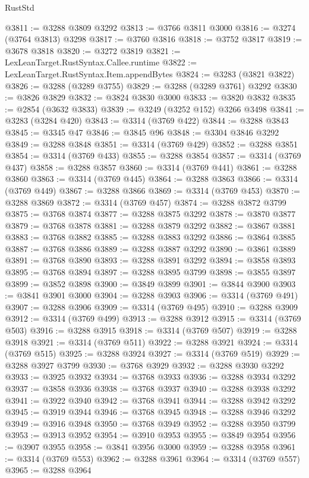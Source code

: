 \begin{lexlean}{RustStd}
\begin{coremodule}
@3811 := @3288 @3809 @3292
@3813 := @3766 @3811 @3000
@3816 := @3274 (@3764 @3813) @3298
@3817 := @3760 @3816
@3818 := @3752 @3817
@3819 := @3678 @3818
@3820 := @3272 @3819
@3821 := LexLeanTarget.RustSyntax.Callee.runtime
@3822 := LexLeanTarget.RustSyntax.Item.appendBytes
@3824 := @3283 (@3821 @3822)
@3826 := @3288 (@3289 @3755)
@3829 := @3288 (@3289 @3761) @3292
@3830 := @3826 @3829
@3832 := @3824 @3830 @3000
@3833 := @3820 @3832
@3835 := @2854 (@3632 @3833)
@3839 := @3249 (@3252 @152) @3266 @3498
@3841 := @3283 (@3284 @420)
@3843 := @3314 (@3769 @422)
@3844 := @3288 @3843
@3845 := @3345 @47
@3846 := @3845 @96
@3848 := @3304 @3846 @3292
@3849 := @3288 @3848
@3851 := @3314 (@3769 @429)
@3852 := @3288 @3851
@3854 := @3314 (@3769 @433)
@3855 := @3288 @3854
@3857 := @3314 (@3769 @437)
@3858 := @3288 @3857
@3860 := @3314 (@3769 @441)
@3861 := @3288 @3860
@3863 := @3314 (@3769 @445)
@3864 := @3288 @3863
@3866 := @3314 (@3769 @449)
@3867 := @3288 @3866
@3869 := @3314 (@3769 @453)
@3870 := @3288 @3869
@3872 := @3314 (@3769 @457)
@3874 := @3288 @3872 @3799
@3875 := @3768 @3874
@3877 := @3288 @3875 @3292
@3878 := @3870 @3877
@3879 := @3768 @3878
@3881 := @3288 @3879 @3292
@3882 := @3867 @3881
@3883 := @3768 @3882
@3885 := @3288 @3883 @3292
@3886 := @3864 @3885
@3887 := @3768 @3886
@3889 := @3288 @3887 @3292
@3890 := @3861 @3889
@3891 := @3768 @3890
@3893 := @3288 @3891 @3292
@3894 := @3858 @3893
@3895 := @3768 @3894
@3897 := @3288 @3895 @3799
@3898 := @3855 @3897
@3899 := @3852 @3898
@3900 := @3849 @3899
@3901 := @3844 @3900
@3903 := @3841 @3901 @3000
@3904 := @3288 @3903
@3906 := @3314 (@3769 @491)
@3907 := @3288 @3906
@3909 := @3314 (@3769 @495)
@3910 := @3288 @3909
@3912 := @3314 (@3769 @499)
@3913 := @3288 @3912
@3915 := @3314 (@3769 @503)
@3916 := @3288 @3915
@3918 := @3314 (@3769 @507)
@3919 := @3288 @3918
@3921 := @3314 (@3769 @511)
@3922 := @3288 @3921
@3924 := @3314 (@3769 @515)
@3925 := @3288 @3924
@3927 := @3314 (@3769 @519)
@3929 := @3288 @3927 @3799
@3930 := @3768 @3929
@3932 := @3288 @3930 @3292
@3933 := @3925 @3932
@3934 := @3768 @3933
@3936 := @3288 @3934 @3292
@3937 := @3858 @3936
@3938 := @3768 @3937
@3940 := @3288 @3938 @3292
@3941 := @3922 @3940
@3942 := @3768 @3941
@3944 := @3288 @3942 @3292
@3945 := @3919 @3944
@3946 := @3768 @3945
@3948 := @3288 @3946 @3292
@3949 := @3916 @3948
@3950 := @3768 @3949
@3952 := @3288 @3950 @3799
@3953 := @3913 @3952
@3954 := @3910 @3953
@3955 := @3849 @3954
@3956 := @3907 @3955
@3958 := @3841 @3956 @3000
@3959 := @3288 @3958
@3961 := @3314 (@3769 @553)
@3962 := @3288 @3961
@3964 := @3314 (@3769 @557)
@3965 := @3288 @3964

\end{coremodule}
\end{lexlean}
